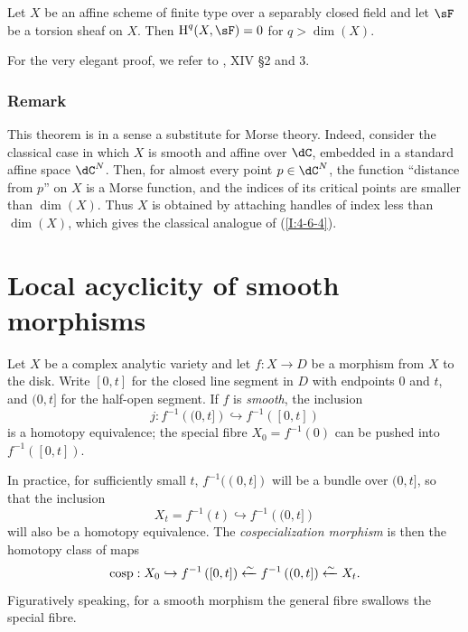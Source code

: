 \begin{theorem}\label{I:4-6-4}
Let $X$ be an affine scheme of finite type over a separably closed field
and let $\sF$ be a torsion sheaf on $X$. Then
$\h^q(X,\sF)=0$ for $q>\dim(X)$.
\end{theorem}

For the very elegant proof, we refer to \cite{sga4}, XIV \S 2 and 3.

\subsubsection{Remark}\label{I:4-6-5}

This theorem is in a sense a substitute for Morse theory. Indeed, consider
the classical case in which $X$ is smooth and affine over $\dC$, embedded
in a standard affine space $\dC^N$. Then, for almost every point
$p\in\dC^N$, the function “distance from $p$” on $X$ is a Morse
function, and the indices of its critical points are smaller than
$\dim(X)$. Thus $X$ is obtained by attaching handles of index less than
$\dim(X)$, which gives the classical analogue of (\ref{I:4-6-4}).

\section{Local acyclicity of smooth morphisms}\label{I:5}

Let $X$ be a complex analytic variety and let $f:X\to D$ be a morphism
from $X$ to the disk. Write $[0,t]$ for the closed line segment in $D$
with endpoints $0$ and $t$, and $(0,t]$ for the half-open segment. If
$f$ is \emph{smooth}, the inclusion
\[
  j : f^{-1}\left((0,t]\right) \hookrightarrow f^{-1}\left([0,t]\right)
\]
is a homotopy equivalence; the special fibre
$X_0=f^{-1}(0)$ can be pushed into $f^{-1}([0,t])$.

In practice, for sufficiently small $t$, $f^{-1}((0,t])$ will be a
bundle over $(0,t]$, so that the inclusion
\[
  X_t = f^{-1}(t) \hookrightarrow f^{-1}\left((0,t]\right)
\]
will also be a homotopy equivalence. The \emph{cospecialization morphism}
is then the homotopy class of maps
\[
  \operatorname{cosp} : X_0 \hookrightarrow f^{-1}\left([0,t]\right) \xleftarrow\sim f^{-1}\left((0,t]\right) \xleftarrow\sim X_t \text{.}
\]
Figuratively speaking,
for a smooth morphism the general fibre swallows the special fibre.

